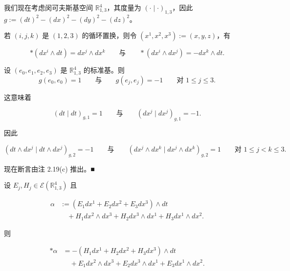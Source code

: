 \begin{example}

我们现在考虑闵可夫斯基空间 $ \mathbb{R}^{4}_{1,3} $，其度量为 $ (\cdot \mid \cdot)_{1,3} $，因此 $ g := (dt)^{2} - (dx)^{2} - (dy)^{2} - (dz)^{2} $。

\begin{items}
\item

若 $ (i,j,k) $ 是 $ (1,2,3) $ 的循环置换，则令 $ (x^{1},x^{2},x^{3}) := (x,y,z) $，有

\[
\ast(dx^{i} \wedge dt) = dx^{j} \wedge dx^{k} \qquad \text{与} \qquad \ast(dx^{i} \wedge dx^{j}) = -dx^{k} \wedge dt .
\]

\proofhead
设 $ (e_{0},e_{1},e_{2},e_{3}) $ 是 $ \mathbb{R}^{4}_{1,3} $ 的标准基。则
\[
g(e_{0},e_{0}) = 1 \qquad \text{与} \qquad g(e_{j},e_{j}) = -1 \qquad \text{对 } 1 \le j \le 3 .
\]

这意味着

\[
(dt \mid dt)_{g,1} = 1 \qquad \text{与} \qquad (dx^{j} \mid dx^{j})_{g,1} = -1 .
\]

因此

\[
(dt \wedge dx^{j} \mid dt \wedge dx^{j})_{g,2} = -1 \qquad \text{与} \qquad (dx^{j} \wedge dx^{k} \mid dx^{j} \wedge dx^{k})_{g,2} = 1 \qquad \text{对 } 1 \le j < k \le 3 .
\]

现在断言由注 2.19(c) 推出。\nobreak\hspace{0.35em}■

\item

设 $ E_{j}, H_{j} \in \mathcal{E}(\mathbb{R}^{4}_{1,3}) $ 且

\begin{equation*}
\begin{aligned}
\alpha &:= (E_{1}dx^{1} + E_{2}dx^{2} + E_{3}dx^{3}) \wedge dt \\ &\quad + H_{1}dx^{2} \wedge dx^{3} + H_{2}dx^{3} \wedge dx^{1} + H_{3}dx^{1} \wedge dx^{2} .
\end{aligned}
\end{equation*}

则

\begin{equation*}
\begin{aligned}
\ast\alpha &= -(H_{1}dx^{1} + H_{2}dx^{2} + H_{3}dx^{3}) \wedge dt \\ &\quad + E_{1}dx^{2} \wedge dx^{3} + E_{2}dx^{3} \wedge dx^{1} + E_{3}dx^{1} \wedge dx^{2} .
\end{aligned}
\end{equation*}


\end{items}
\end{example}
